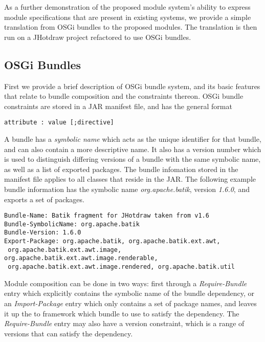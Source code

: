 As a further demonstration of the proposed module system's ability to 
express module specifications that are present in existing systems, 
we provide a simple translation from OSGi bundles to the proposed modules.
The translation is then run on a JHotdraw project refactored to use
OSGi bundles.

\subsection{OSGi Bundles}

First we provide a brief description of OSGi bundle system, and its basic
features that relate to bundle composition and the constraints thereon.
OSGi bundle constraints are stored in a JAR manifest file, and has the
general format

\begin{lstlisting}
attribute : value [;directive]
\end{lstlisting}

A bundle has a \textit{symbolic name} which acts as the unique identifier for that bundle, 
and can also contain a more descriptive name.
It also has a version number which is used to distinguish differing versions of
a bundle with the same symbolic name, as well as a list of exported packages.
 The bundle infomation stored in the
manifest file applies to all classes that reside in the JAR. The following example
bundle information has the symbolic name \textit{org.apache.batik}, version \textit{1.6.0},
and exports a set of packages.

\begin{lstlisting}[caption=Basic OSGi bundle]
Bundle-Name: Batik fragment for JHotdraw taken from v1.6
Bundle-SymbolicName: org.apache.batik
Bundle-Version: 1.6.0
Export-Package: org.apache.batik, org.apache.batik.ext.awt,
 org.apache.batik.ext.awt.image, org.apache.batik.ext.awt.image.renderable,
 org.apache.batik.ext.awt.image.rendered, org.apache.batik.util
\end{lstlisting}

Module composition can be done in two ways: first through a \textit{Require-Bundle}
entry which explicitly contains the symbolic name of the bundle dependency, or an
\textit{Import-Package} entry which only contains a set of package names, and leaves
it up the to framework which bundle to use to satisfy the dependency. The \textit{Require-Bundle}
entry may also have a version constraint, which is a range of versions that can satisfy
the dependency.

